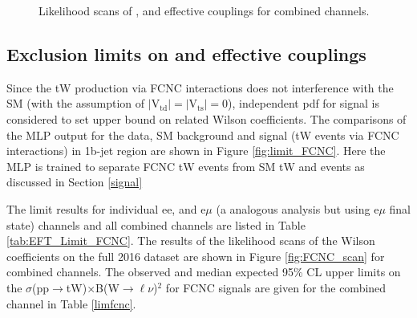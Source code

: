 \begin{figure}[ht]
\begin{center}
\begin{tabular}{cc}
    \end{tabular}
    \caption{Likelihood scans of \CtG, \Cphiq and \CtW effective couplings for combined channels.
    \label{fig:EFT_scan}}
  \end{center}
\end{figure}

\clearpage

\subsection {Exclusion limits on \texorpdfstring{\CuG and \CcG  effective couplings}{}}

Since the tW production via FCNC interactions does not interference with the SM (with the assumption of $|\text{V}_{\text{td}}| = |\text{V}_{\text{ts}}| = 0$),
independent pdf for signal is considered  to set upper bound on related Wilson coefficients. The comparisons of the MLP output for the data, SM background  and signal (tW events via FCNC interactions) in 1b-jet region are shown in Figure \ref{fig:limit_FCNC}. Here the MLP is trained to separate FCNC tW events from SM tW and \ttbar events as discussed in Section \ref{signal}

The limit results for individual ee, \mumu and e$\mu$ (a analogous analysis but using e$\mu$ final state) channels and all combined channels are listed in Table \ref{tab:EFT_Limit_FCNC}.
The results of the likelihood scans of the Wilson coefficients on the full 2016 dataset are shown in Figure \ref{fig:FCNC_scan} for combined channels.
The observed and median expected 95\% CL upper limits on the  $\sigma$(pp$\rightarrow$tW)$\times$B(W$\rightarrow \ell\nu$)$^2$ for FCNC signals are given for the combined channel in Table \ref{limfcnc}.

